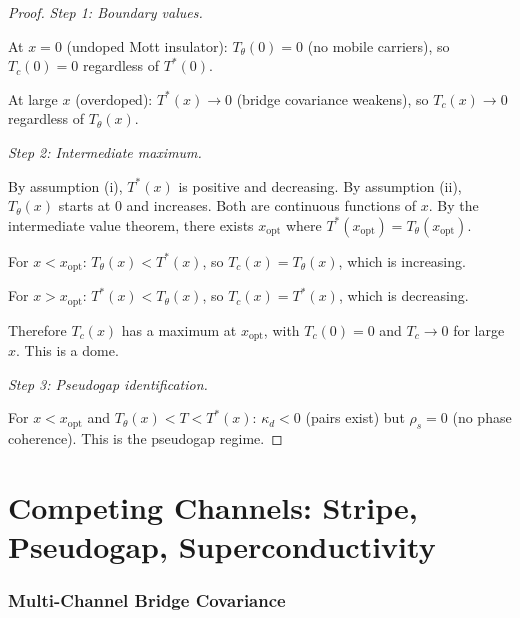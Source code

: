 \documentclass[12pt]{article}
\theoremstyle{plain}
\theoremstyle{definition}
\numberwithin{equation}{section}
\begin{document}
\begin{proof}
\emph{Step 1: Boundary values.}

At $x=0$ (undoped Mott insulator): $T_\theta(0)=0$ (no mobile
carriers), so $T_c(0)=0$ regardless of $T^*(0)$.

At large $x$ (overdoped): $T^*(x)\to 0$ (bridge covariance
weakens), so $T_c(x)\to 0$ regardless of $T_\theta(x)$.

\emph{Step 2: Intermediate maximum.}

By assumption (i), $T^*(x)$ is positive and decreasing.
By assumption (ii), $T_\theta(x)$ starts at $0$ and increases.
Both are continuous functions of $x$.  By the intermediate value
theorem, there exists $x_{\mathrm{opt}}$ where
$T^*(x_{\mathrm{opt}})=T_\theta(x_{\mathrm{opt}})$.

For $x<x_{\mathrm{opt}}$:
$T_\theta(x)<T^*(x)$, so $T_c(x)=T_\theta(x)$, which is
increasing.

For $x>x_{\mathrm{opt}}$:
$T^*(x)<T_\theta(x)$, so $T_c(x)=T^*(x)$, which is decreasing.

Therefore $T_c(x)$ has a maximum at $x_{\mathrm{opt}}$, with
$T_c(0)=0$ and $T_c\to 0$ for large $x$.  This is a dome.

\emph{Step 3: Pseudogap identification.}

For $x<x_{\mathrm{opt}}$ and $T_\theta(x)<T<T^*(x)$:
$\kappa_d<0$ (pairs exist) but $\rho_s=0$ (no phase coherence).
This is the pseudogap regime.
\end{proof}


\part{Competing Channels: Stripe, Pseudogap, Superconductivity}

\section{Multi-Channel Bridge Covariance}\label{sec:competing}
\end{document}
